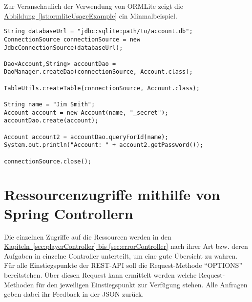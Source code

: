 Zur Veranschaulich der Verwendung von ORMLite zeigt die \hyperref[lst:ormliteUsageExample]{Abbildung~\ref{lst:ormliteUsageExample}} ein Minmalbeispiel.
\begin{lstlisting}[style=lstStyleFramed, caption={[Beispiel: Verwendung von ORMLite\protect\footnote{verändert nach \cite{ormlite}}] Beispiel: Verwendung von ORMLite\protect\footnotemark}, label=lst:ormliteUsageExample]
String databaseUrl = "jdbc:sqlite:path/to/account.db";
ConnectionSource connectionSource = new JdbcConnectionSource(databaseUrl);

Dao<Account,String> accountDao = DaoManager.createDao(connectionSource, Account.class);

TableUtils.createTable(connectionSource, Account.class);

String name = "Jim Smith";
Account account = new Account(name, "_secret");
accountDao.create(account);

Account account2 = accountDao.queryForId(name);
System.out.println("Account: " + account2.getPassword());

connectionSource.close();
\end{lstlisting}

\section{Ressourcenzugriffe mithilfe von Spring Controllern}
Die einzelnen Zugriffe auf die Ressourcen werden in den \hyperref[sec:playerController, sec:errorcontroller]{Kapiteln~\ref{sec:playerController} bis \ref{sec:errorController}} nach ihrer Art bzw. deren Aufgaben in einzelne Controller unterteilt, um eine gute Übersicht zu wahren. Für alle Einstiegspunkte der \gls{REST}-\gls{API} soll die Request-Methode \enquote{OPTIONS} bereitstehen. Über diesen Request kann ermittelt werden welche Request-Methoden für den jeweiligen Einstiegspunkt zur Verfügung stehen. Alle Anfragen geben dabei ihr Feedback in der \gls{JSON} zurück. 

